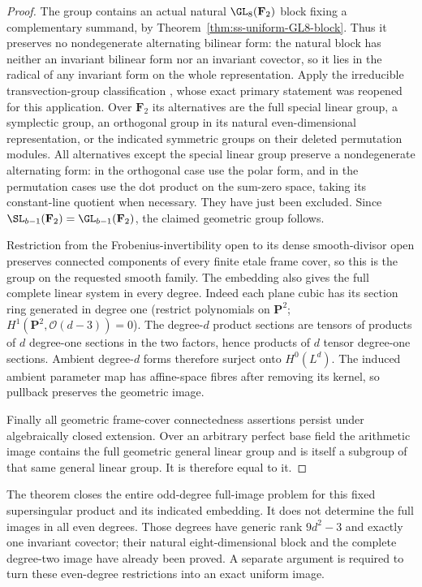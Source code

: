 \begin{proof}
The group contains an actual natural $\GL_8(\mathbf F_2)$ block
fixing a complementary summand, by
Theorem~\ref{thm:ss-uniform-GL8-block}. Thus it preserves no
nondegenerate alternating bilinear form: the natural block has
neither an invariant bilinear form nor an invariant covector,
so it lies in the radical of any invariant form on the whole
representation.
Apply the irreducible transvection-group classification
\cite[Theorem~3.6, printed p.~22]{KantorSeress2001}, whose exact
primary statement was reopened for this application. Over
$\mathbf F_2$ its alternatives are the full special linear
group, a symplectic group, an orthogonal group in its natural
even-dimensional representation, or the indicated symmetric
groups on their deleted permutation modules. All alternatives
except the special linear group preserve a nondegenerate
alternating form: in the orthogonal case use the polar form,
and in the permutation cases use the dot product on the
sum-zero space, taking its constant-line quotient when necessary.
They have just been excluded. Since
$\SL_{b-1}(\mathbf F_2)=\GL_{b-1}(\mathbf F_2)$, the claimed
geometric group follows.

Restriction from the Frobenius-invertibility open to its dense
smooth-divisor open preserves connected components of every finite
etale frame cover, so this is the group on the requested smooth
family. The embedding also gives the full complete linear system
in every degree. Indeed each plane cubic has its section ring
generated in degree one (restrict polynomials on $\mathbf P^2$;
$H^1(\mathbf P^2,\mathcal O(d-3))=0$). The degree-$d$ product
sections are tensors of products of $d$ degree-one sections in
the two factors, hence products of $d$ tensor degree-one sections.
Ambient degree-$d$ forms therefore surject onto $H^0(L^d)$.
The induced ambient parameter map has affine-space fibres after
removing its kernel, so pullback preserves the geometric image.

Finally all geometric frame-cover connectedness assertions persist
under algebraically closed extension. Over an arbitrary perfect
base field the arithmetic image contains the full geometric
general linear group and is itself a subgroup of that same
general linear group. It is therefore equal to it.
\end{proof}

\begin{remark}
The theorem closes the entire odd-degree full-image problem for
this fixed supersingular product and its indicated embedding.
It does not determine the full images in all even degrees.
Those degrees have generic rank $9d^2-3$ and exactly one invariant
covector; their natural eight-dimensional block and the complete
degree-two image have already been proved. A separate argument
is required to turn these even-degree restrictions into an exact
uniform image.
\end{remark}
